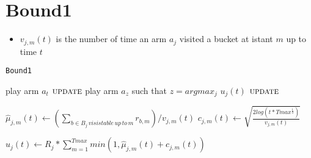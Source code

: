 \section{Bound1}
\begin{itemize}
	\item $v_{j,m}(t)$ is the number of time an arm $a_j$ visited a bucket at istant $m$ up to time $t$
	
\end{itemize}
\begin{algorithm}[!h]
	\caption{\texttt{Bound1}}
	\begin{scriptsize}
		\begin{algorithmic}[1]
			
			
			\Statex
			 
			\State play arm $a_t$\;
			\State $\textsc{update}$
			\EndFor
			 
			\State play arm $a_z$ such that  $z = argmax_j$ $u_j (t)$\;
			\State $\textsc{update}$
			\EndFor
			\EndFunction
			\Statex
			
			
				
				\State$\hat{\mu}_{j,m}(t)  \gets (\sum_{b \in B_j\, visistable\, up \,to\, m}{}{r_{b,m}})/ v_{j,m}(t)$\;
				\State$c_{j,m}(t)\gets  \sqrt{\frac{2log(t*Tmax^{\frac{1}{4}})}{v_{j,m}(t)}}$\;
			
			\EndFor		
			
			\State $u_j(t) \gets  R_j *\sum_{m=1}^{Tmax} min(1,\hat{\mu}_{j,m}(t)+c_{j,m}(t)) $\;	
			\EndFor
			
	
			
			
			\EndFunction
			
		\end{algorithmic}
	\end{scriptsize}
	\label{alg:Bound1}
\end{algorithm}



